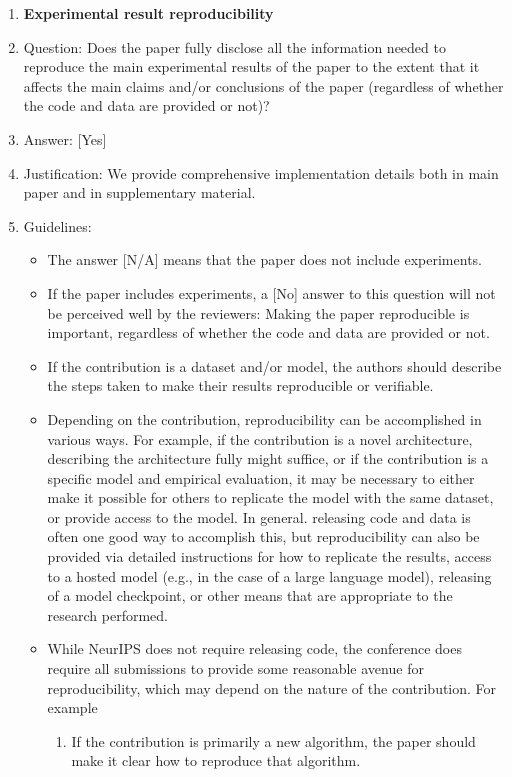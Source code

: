 \documentclass{llmxive}
\providecommand{\answerYes}[1][]{[Yes]#1}
\providecommand{\answerNo}[1][]{[No]#1}
\providecommand{\answerNA}[1][]{[N/A]#1}
\begin{document}
{\begin{enumerate}
    \item {\bf Experimental result reproducibility}
    \item[] Question: Does the paper fully disclose all the information needed to reproduce the main experimental results of the paper to the extent that it affects the main claims and/or conclusions of the paper (regardless of whether the code and data are provided or not)?
    \item[] Answer: \answerYes{} %
    \item[] Justification: We provide comprehensive implementation details both in main paper and in supplementary material.
    \item[] Guidelines:
    \begin{itemize}
        \item The answer \answerNA{} means that the paper does not include experiments.
        \item If the paper includes experiments, a \answerNo{} answer to this question will not be perceived well by the reviewers: Making the paper reproducible is important, regardless of whether the code and data are provided or not.
        \item If the contribution is a dataset and\slash or model, the authors should describe the steps taken to make their results reproducible or verifiable. 
        \item Depending on the contribution, reproducibility can be accomplished in various ways. For example, if the contribution is a novel architecture, describing the architecture fully might suffice, or if the contribution is a specific model and empirical evaluation, it may be necessary to either make it possible for others to replicate the model with the same dataset, or provide access to the model. In general. releasing code and data is often one good way to accomplish this, but reproducibility can also be provided via detailed instructions for how to replicate the results, access to a hosted model (e.g., in the case of a large language model), releasing of a model checkpoint, or other means that are appropriate to the research performed.
        \item While NeurIPS does not require releasing code, the conference does require all submissions to provide some reasonable avenue for reproducibility, which may depend on the nature of the contribution. For example
        \begin{enumerate}
            \item If the contribution is primarily a new algorithm, the paper should make it clear how to reproduce that algorithm.

\end{enumerate}
\end{itemize}
\end{enumerate}}
\end{document}

